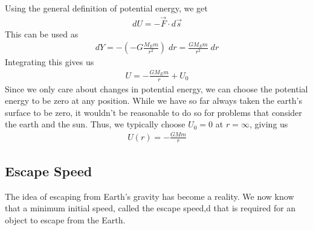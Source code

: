 \documentclass[11pt]{article}
\begin{document}
Using the general definition of potential energy, we get
\begin{align*}
    dU = - \Vec{F}\cdot d\Vec{s}
\end{align*}
This can be used as
\begin{align*}
    dY = -\left(-G \frac{M_E m}{r^2}\right)\;dr = \frac{GM_E m}{r^2}\;dr
\end{align*}
Integrating this gives us
\begin{align*}
    U = - \frac{GM_E m}{r} + U_0
\end{align*}
Since we only care about changes in potential energy, we can choose the potential energy to be zero at any position. While we have so far always taken the earth's surface to be zero, it wouldn't be reasonable to do so for problems that consider the earth and the sun. Thus, we typically choose $U_0 = 0$ at $r = \infty$, giving us
\begin{align*}
    U(r) = -\frac{GMm}{r}
\end{align*}

\subsection{Escape Speed}

The idea of escaping from Earth's gravity has become a reality. We now know that a minimum initial speed, called the escape speed,d that is required for an object to escape from the Earth. 
\end{document}
